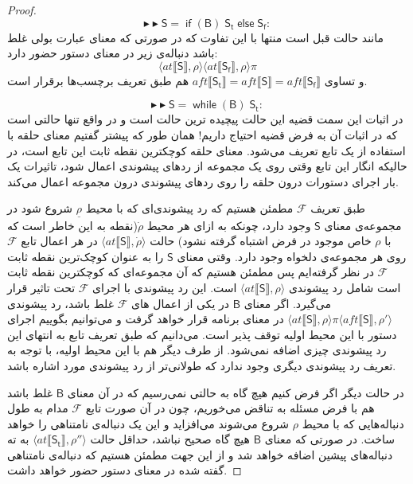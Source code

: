 \begin{proof}
$$\blacktriangleright\blacktriangleright \mathsf{S=\; if\;(B)\;S_t\;else\;S_f}:$$
مانند حالت قبل است منتها با این تفاوت که در صورتی که معنای عبارت بولی غلط باشد دنباله‌ی زیر در معنای دستور حضور دارد:
	$$\langle at \llbracket \mathsf{S} \rrbracket , \rho \rangle
\langle at \llbracket \mathsf{S_f} \rrbracket , \rho \rangle \pi$$
و تساوی 
$aft \llbracket \mathsf{S_t} \rrbracket=aft \llbracket \mathsf{S} \rrbracket=aft \llbracket \mathsf{S_f} \rrbracket$
هم طبق تعریف برچسب‌ها برقرار است.

$$\blacktriangleright\blacktriangleright \mathsf{S=\; while\;(B)\;S_t}:$$
در اثبات این سمت قضیه این حالت پیچیده ترین حالت است و در واقع تنها حالتی است که در اثبات آن به فرض قضیه احتیاج داریم! همان طور که پیشتر گفتیم معنای حلقه با استفاده از یک تابع تعریف می‌شود. معنای حلقه کوچکترین نقطه ثابت این تابع است، در حالیکه انگار این تابع وقتی روی یک مجموعه از ردهای پیشوندی اعمال شود، تاثیرات یک بار اجرای دستورات درون حلقه را روی ردهای پیشوندی درون مجموعه اعمال می‌کند.

طبق تعریف $\mathcal{F}$ مطمئن هستیم که رد پیشوندی‌ای که با محیط $\underline{\rho}$ شروع شود در مجموعه‌ی معنای $\mathsf{S}$ وجود دارد، چونکه به ازای هر محیط $\dot{\rho}$(نقطه به این خاطر است که با $\rho$ خاص موجود در فرض اشتباه گرفته نشود) حالت 
$\langle at \llbracket \mathsf{S} \rrbracket, \dot{\rho} \rangle$
 در هر اعمال تابع $\mathcal{F}$ روی هر مجموعه‌ی دلخواه وجود دارد. وقتی معنای $\mathsf{S}$ را به عنوان کوچک‌ترین نقطه ثابت $\mathcal{F}$ در نظر گرفته‌ایم پس مطمئن هستیم که آن مجموعه‌ای که کوچکترین نقطه ثابت است شامل رد پیشوندی 
 $\langle at \llbracket \mathsf{S} \rrbracket, \rho \rangle$
 است. این رد پیشوندی با اجرای $\mathcal{F}$ تحت تاثیر قرار می‌گیرد. اگر معنای $\mathsf{B}$ در یکی از اعمال های $\mathcal{F}$ غلط باشد، رد پیشوندی
$ \langle at \llbracket \mathsf{S} \rrbracket, \rho \rangle \pi \langle aft \llbracket \mathsf{S} \rrbracket , \rho' \rangle$ 
در معنای برنامه قرار خواهد گرفت و می‌توانیم بگوییم اجرای دستور با این محیط اولیه توقف پذیر است. می‌دانیم که طبق تعریف تابع به انتهای این رد پیشوندی چیزی اضافه نمی‌شود. از طرف دیگر هم با این محیط اولیه، با توجه به تعریف رد پیشوندی دیگری وجود ندارد که طولانی‌تر از رد پیشوندی مورد اشاره باشد. 

در حالت دیگر اگر فرض کنیم هیچ گاه به حالتی نمی‌رسیم که در آن معنای $\mathsf{B}$ غلط باشد هم با فرض مسئله به تناقض می‌خوریم، چون در آن صورت تابع $\mathcal{F}$ مدام به طول دنباله‌‌هایی که با محیط $\rho$ شروع می‌شوند می‌افزاید و این یک دنباله‌ی نامتناهی را خواهد ساخت. در صورتی که معنای $\mathsf{B}$ هیچ گاه صحیح نباشد، حداقل حالت 
$\langle at \llbracket \mathsf{S_t} \rrbracket , \rho'' \rangle$
به ته دنباله‌های پیشین اضافه خواهد شد و از این جهت مطمئن هستیم که دنباله‌ی نامتناهی گفته شده در معنای دستور حضور خواهد داشت. 


\end{proof}
